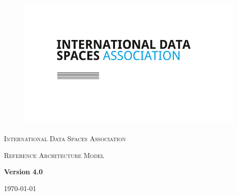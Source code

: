 \documentclass[12pt]{article}
\renewcommand{\_}{\kern-1.5pt\textunderscore\kern-1.5pt}
\begin{document}
\begin{titlepage}

\begin{figure}[H]
\advance\leftskip 2.87in		\includegraphics[width=4.66in,height=2.62in]{./media/image1.png}
\end{figure}


	\centering


	{\scshape\Large International Data Spaces Association \par}
	\vspace{1cm}
	{\scshape\Large Reference Architecture Model\par}
	\vspace{1.5cm}
	{\huge\bfseries Version 4.0\par}
	\vspace{2cm}
	
	\vfill

	{\large \today\par}
\end{titlepage}




\newpage






\newpage




\newpage


\end{document}
